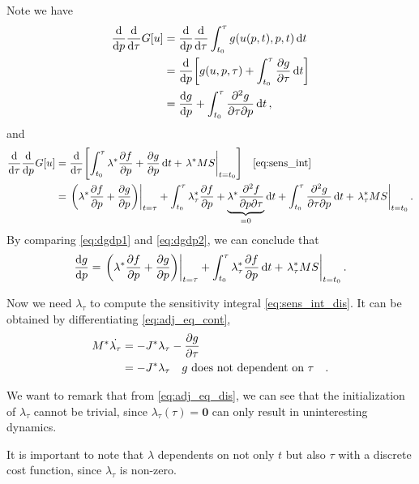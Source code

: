 \documentclass[a4paper,9pt]{article}
\theoremstyle{definition}
\theoremstyle{remark}
\begin{document}
Note we have
\begin{align}
  \dv{p} \dv{\tau} G[u] &= \dv{p} \dv{\tau} \int_{t_0}^{\tau} g(u(p, t), p, t) \dd{t} \\
                        &= \dv{p}\qty[g(u, p, \tau) + \int_{t_0}^{\tau}
                        \pdv{g}{\tau} \dd{t}] \\
                        &= \dv{g}{p} + \int_{t_0}^{\tau}
                        \pdv{g}{\tau}{p} \dd{t}, \label{eq:dgdp1}
\end{align}
and
\begin{align}
  \dv{\tau} \dv{p} G[u] &= \dv{\tau} \qty[\int_{t_0}^{\tau} \lambda^* \pdv{f}{p} +
  \pdv{g}{p} \dd{t} + \eval{\lambda^* MS}_{t=t_0}] \qq{\cref{eq:sens_int}}\\
                        &= \eval{\qty(\lambda^* \pdv{f}{p} + \pdv{g}{p})}_{t=\tau} +
                        \int_{t_0}^\tau \lambda_\tau^* \pdv{f}{p} +
                        \underbrace{\lambda^* \pdv{f}{p}{\tau}}_{=0}\dd{t}
                        + \int_{t_0}^\tau \pdv{g}{\tau}{p} \dd{t} +
                        \eval{\lambda_\tau^* MS}_{t=t_0}. \label{eq:dgdp2}
\end{align}
By comparing \cref{eq:dgdp1} and \cref{eq:dgdp2}, we can conclude that
\begin{equation} \label{eq:sens_int_dis}
  \dv{g}{p} = \eval{\qty(\lambda^* \pdv{f}{p} + \pdv{g}{p})}_{t=\tau} +
  \int_{t_0}^\tau \lambda_\tau^* \pdv{f}{p} \dd{t} +
  \eval{\lambda_\tau^* MS}_{t=t_0}.
\end{equation}

Now we need $\lambda_\tau$ to compute the sensitivity integral
\cref{eq:sens_int_dis}. It can be obtained by differentiating
\cref{eq:adj_eq_cont},
\begin{align}
  M^*\dot{\lambda_\tau} &= -J^* \lambda_\tau - \pdv{g}{\tau} \\
                               &= -J^* \lambda_\tau \qq{$g$ does not
                               dependent on $\tau$}. \label{eq:adj_eq_dis}
\end{align}

We want to remark that from \cref{eq:adj_eq_dis}, we can see that the
initialization of $\lambda_\tau$ cannot be trivial, since
$\lambda_\tau(\tau) = \bm{0}$ can only result in uninteresting dynamics.

It is important to note that $\lambda$ dependents on not only $t$ but also
$\tau$ with a discrete cost function, since $\lambda_\tau$ is non-zero.
\end{document}
